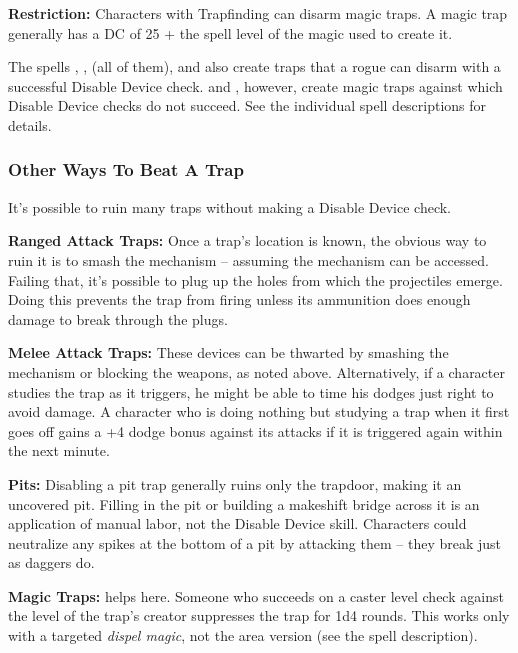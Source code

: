 \textbf{Restriction:} Characters with Trapfinding can disarm magic traps. A magic trap generally has a DC of 25 + the spell level of the magic used to create it.

The spells , ,  (all of them), and  also create traps that a rogue can disarm with a successful Disable Device check.  and , however, create magic traps against which Disable Device checks do not succeed. See the individual spell descriptions for details.

\subsubsection{Other Ways To Beat A Trap}

It's possible to ruin many traps without making a Disable Device check.

\textbf{Ranged Attack Traps:} Once a trap's location is known, the obvious way to ruin it is to smash the mechanism -- assuming the mechanism can be accessed. Failing that, it's possible to plug up the holes from which the projectiles emerge. Doing this prevents the trap from firing unless its ammunition does enough damage to break through the plugs.

\textbf{Melee Attack Traps:} These devices can be thwarted by smashing the mechanism or blocking the weapons, as noted above. Alternatively, if a character studies the trap as it triggers, he might be able to time his dodges just right to avoid damage. A character who is doing nothing but studying a trap when it first goes off gains a +4 dodge bonus against its attacks if it is triggered again within the next minute.

\textbf{Pits:} Disabling a pit trap generally ruins only the trapdoor, making it an uncovered pit. Filling in the pit or building a makeshift bridge across it is an application of manual labor, not the Disable Device skill. Characters could neutralize any spikes at the bottom of a pit by attacking them -- they break just as daggers do.

\textbf{Magic Traps:}  helps here. Someone who succeeds on a caster level check against the level of the trap's creator suppresses the trap for 1d4 rounds. This works only with a targeted \textit{dispel magic}, not the area version (see the spell description).
